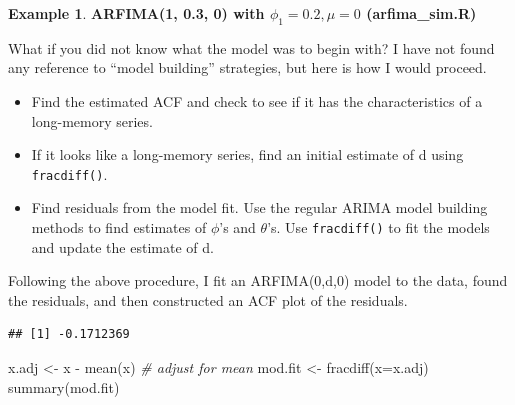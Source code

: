 \documentclass[
]{book}
\newenvironment{Shaded}{\begin{snugshade}}{\end{snugshade}}
\newcommand{\AttributeTok}[1]{\textcolor[rgb]{0.77,0.63,0.00}{#1}}
\newcommand{\CommentTok}[1]{\textcolor[rgb]{0.56,0.35,0.01}{\textit{#1}}}
\newcommand{\ConstantTok}[1]{\textcolor[rgb]{0.00,0.00,0.00}{#1}}
\newcommand{\FunctionTok}[1]{\textcolor[rgb]{0.00,0.00,0.00}{#1}}
\newcommand{\NormalTok}[1]{#1}
\newcommand{\OtherTok}[1]{\textcolor[rgb]{0.56,0.35,0.01}{#1}}
\newcommand{\SpecialCharTok}[1]{\textcolor[rgb]{0.00,0.00,0.00}{#1}}
\newcommand{\StringTok}[1]{\textcolor[rgb]{0.31,0.60,0.02}{#1}}
\providecommand{\tightlist}{%
  \setlength{\itemsep}{0pt}\setlength{\parskip}{0pt}}
\theoremstyle{definition}
\theoremstyle{definition}
\newtheorem{example}{Example}[chapter]
\theoremstyle{definition}
\theoremstyle{definition}
\theoremstyle{remark}
\begin{document}
\begin{example}
\textbf{ARFIMA(1, 0.3, 0) with \(\phi_1=0.2, \mu=0\) (arfima\_sim.R)}

What if you did not know what the model was to begin with? I have not found any reference to ``model building'' strategies, but here is how I would proceed.

\begin{itemize}
\tightlist
\item
  Find the estimated ACF and check to see if it has the characteristics of a long-memory series.
\item
  If it looks like a long-memory series, find an initial estimate of d using \texttt{fracdiff()}.\\
\item
  Find residuals from the model fit. Use the regular ARIMA model building methods to find estimates of \(\phi\)'s and \(\theta\)'s. Use \texttt{fracdiff()} to fit the models and update the estimate of d.~
\end{itemize}

Following the above procedure, I fit an ARFIMA(0,d,0) model to the data, found the residuals, and then constructed an ACF plot of the residuals.

\begin{Shaded}
\end{Shaded}

\begin{verbatim}
## [1] -0.1712369
\end{verbatim}

\begin{Shaded}
\begin{Highlighting}[]
\NormalTok{x.adj }\OtherTok{\textless{}{-}}\NormalTok{ x }\SpecialCharTok{{-}} \FunctionTok{mean}\NormalTok{(x) }\CommentTok{\# adjust for mean}
\NormalTok{mod.fit }\OtherTok{\textless{}{-}} \FunctionTok{fracdiff}\NormalTok{(}\AttributeTok{x=}\NormalTok{x.adj)}
\FunctionTok{summary}\NormalTok{(mod.fit)}
\end{Highlighting}
\end{Shaded}


\end{example}
\end{document}
